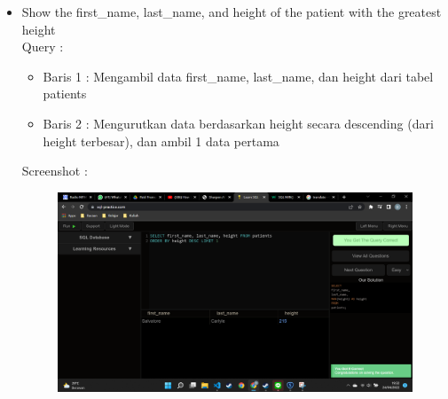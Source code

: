 \documentclass[]{article}
\begin{document}
\begin{itemize}
        \item Show the first\_name, last\_name, and height of the patient with the greatest height
        \\Query :
        
        \begin{itemize}
            \item Baris 1 : Mengambil data first\_name, last\_name, dan height dari tabel patients
            \item Baris 2 : Mengurutkan data berdasarkan height secara descending (dari height terbesar), dan ambil 1 data pertama
        \end{itemize}
        Screenshot :
        \begin{figure}[h]
            \includegraphics[scale=0.3]{./Screenshot/Easy-9.png}
            \centering
        \end{figure}


\end{itemize}
\end{document}
